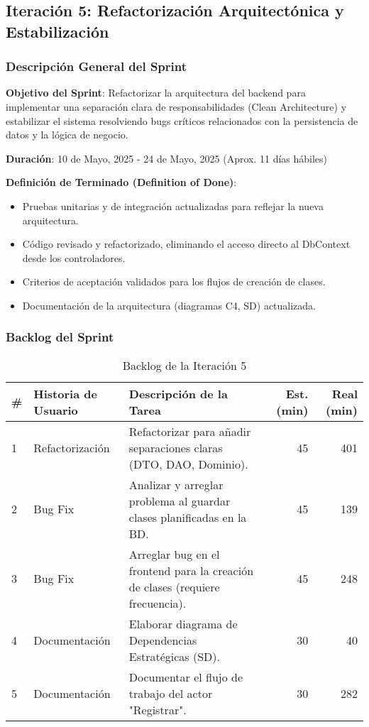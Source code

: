 \subsection{Iteración 5: Refactorización Arquitectónica y Estabilización}

\subsubsection{Descripción General del Sprint}

\textbf{Objetivo del Sprint}: Refactorizar la arquitectura del backend para implementar una separación clara de responsabilidades (Clean Architecture) y estabilizar el sistema resolviendo bugs críticos relacionados con la persistencia de datos y la lógica de negocio.

\textbf{Duración}: 10 de Mayo, 2025 - 24 de Mayo, 2025 (Aprox. 11 días hábiles)

\textbf{Definición de Terminado (Definition of Done)}: 
\begin{itemize}
    \item Pruebas unitarias y de integración actualizadas para reflejar la nueva arquitectura.
    \item Código revisado y refactorizado, eliminando el acceso directo al DbContext desde los controladores.
    \item Criterios de aceptación validados para los flujos de creación de clases.
    \item Documentación de la arquitectura (diagramas C4, SD) actualizada.
\end{itemize}

\subsubsection{Backlog del Sprint}

\begin{table}[H]
\caption{Backlog de la Iteración 5}
\label{tab:iteration-5-backlog}
\begin{tabularx}{\textwidth}{@{}llXrr@{}}
\toprule
\textbf{\#} & \textbf{Historia de Usuario} & \textbf{Descripción de la Tarea} & \textbf{Est. (min)} & \textbf{Real (min)} \\
\midrule
    1 & Refactorización & Refactorizar para añadir separaciones claras (DTO, DAO, Dominio). & 45 & 401 \\
    2 & Bug Fix & Analizar y arreglar problema al guardar clases planificadas en la BD. & 45 & 139 \\
    3 & Bug Fix & Arreglar bug en el frontend para la creación de clases (requiere frecuencia). & 45 & 248 \\
    4 & Documentación & Elaborar diagrama de Dependencias Estratégicas (SD). & 30 & 40 \\
    5 & Documentación & Documentar el flujo de trabajo del actor "Registrar". & 30 & 282 \\
\bottomrule
\end{tabularx}
\end{table}

